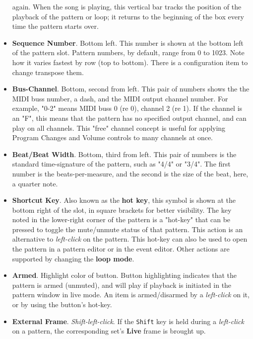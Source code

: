 \begin{itemize}
         again.
         When the song is playing, this vertical bar
         tracks the position of the playback of the pattern or loop; it
         returns to the beginning of the box every time the pattern starts
         over.
      \item \textbf{Sequence Number}. Bottom left.
         This number is shown at the bottom left of the pattern slot.
         Pattern numbers, by default, range from 0 to 1023.
         Note how it varies fastest by row (top to bottom).
         There is a configuration item to change transpose them.
      \item \textbf{Bus-Channel}. Bottom, second from left.
         This pair of numbers shows the the MIDI buss number, a dash, and
         the MIDI output channel number.
         For example, "0-2" means MIDI buss 0 (re 0), channel 2 (re 1).
         If the channel is an "F", this means that the pattern has no specified
         output channel, and can play on all channels.
         This "free" channel concept is useful for applying Program Changes and
         Volume controls to many channels at once.
      \item \textbf{Beat/Beat Width}. Bottom, third from left.
         This pair of numbers is the standard time-signature of the pattern,
         such as "4/4" or "3/4".  The first number is the beats-per-measure,
         and the second is the size of the beat, here, a quarter note.
      \item \textbf{Shortcut Key}.  Also known as the
         \textbf{hot key}, this symbol is shown at the bottom right of the
         slot, in square brackets for better visibility.
         The key noted in the lower-right corner of the pattern is a "hot-key"
         that can be pressed to toggle the mute/unmute status of that pattern.
         This action is an alternative to
         \textsl{left-click} on the pattern.
         This hot-key can also be used to open the pattern in a pattern editor
         or in the event editor.
         Other actions are supported by changing the 
         \textbf{loop mode}.
      \item \textbf{Armed}. Highlight color of button.
         Button highlighting indicates that the pattern is armed
         (unmuted), and will play if playback is initiated in the pattern
         window in live mode.
         An item is armed/disarmed by a
         \textsl{left-click} on it, or by using the
         button's hot-key.
      \item \textbf{External Frame}. \textsl{Shift-left-click}.
         If the \texttt{Shift} key is held during a
         \textsl{left-click} on a pattern,
         the corresponding set's \textbf{Live} frame is brought up.
   \end{itemize}

